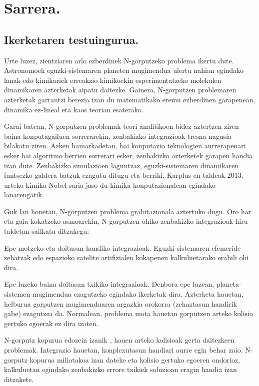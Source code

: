 \chapter{Sarrera.}


\section{Ikerketaren testuingurua.}

Urte luzez, zientziaren arlo ezberdinek N-gorputzeko problema ikertu dute. Astronomoek eguzki-sistemaren planeten mugimendua ulertu nahian egindako lanak edo kimikariek erreakzio kimikoekin esperimentatzeko molekulen dinamikaren azterketak aipatu daitezke. Gainera,  N-gorputzen problemaren azterketak garrantzi berezia izan du matematikako eremu ezberdinen garapenean,  dinamika ez-lineal eta kaos teorian esaterako. 

Garai batean, N-gorputzen problemak teori analitikoen bidez aztertzen ziren baina konputagailuen sorrerarekin, zenbakizko integrazioak tresna nagusia bilakatu ziren. Azken hamarkadetan, bai konputazio teknologien aurrerapenari esker bai algoritmo berrien sorrerari esker, zenbakizko azterketek garapen handia izan dute. Zenbakizko simulazioen laguntzaz, eguzki-sistemaren dinamikaren funtsezko galdera batzuk ezagutu ditugu eta berriki, Karplus-en taldeak 2013. urteko kimika Nobel saria \cite{Karplus2014} jaso du kimika konputazionalean egindako lanarengatik.       

Guk lan honetan, N-gorputzen problema grabitazionala aztertuko dugu. Oro har eta gaia kokatzeko asmoarekin, N-gorputzen ohiko zenbakizko  integrazioak hiru taldetan sailkatu ditzakegu:
\begin{enumerate}
{
\item Epe motzeko eta doitasun handiko integrazioak. 
 Eguzki-sistemaren efemeride zehatzak \cite{Folkner2014} edo espazioko satelite artifizialen kokapenen \cite{Beylkin2014} kalkuluetarako erabili ohi dira.
\item Epe luzeko baina doitasun txikiko integrazioak.
 Denbora epe luzean, planeta-sistemen mugimendua ezagutzeko egindako ikerketak dira. Azterketa hauetan, helburua gorputzen mugimenduaren argazkia orokorra (zehaztasun handirik gabe) ezagutzea da. Normalean, problema mota hauetan gorputzen arteko kolisio gertuko egoerak ez dira izaten.     
\item N-gorputz kopurua edozein izanik , hauen arteko kolisioak gerta daitezkeen problemak.
 Integrazio hauetan, konplexutasun handiari aurre egin behar zaio. N-gorputz kopurua miliotakoa \cite{Ishiyama2012} izan dateke eta kolisio gertuko egoeren ondorioz, kalkuluetan egindako zenbakizko errore txikiek soluzioan eragin handia izan ditzakete.    
}
\end{enumerate}

